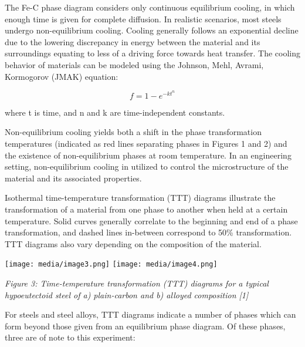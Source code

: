\documentclass[]{article}
\begin{document}
The Fe-C phase diagram considers only continuous equilibrium cooling, in
which enough time is given for complete diffusion. In realistic
scenarios, most steels undergo non-equilibrium cooling. Cooling
generally follows an exponential decline due to the lowering discrepancy
in energy between the material and its surroundings equating to less of
a driving force towards heat transfer. The cooling behavior of materials
can be modeled using the Johnson, Mehl, Avrami, Kormogorov (JMAK)
equation:

\[f = 1 - e^{- kt^{n}}\]

where t is time, and n and k are time-independent constants.

Non-equilibrium cooling yields both a shift in the phase transformation
temperatures (indicated as red lines separating phases in Figures 1 and
2) and the existence of non-equilibrium phases at room temperature. In
an engineering setting, non-equilibrium cooling in utilized to control
the microstructure of the material and its associated properties.

Isothermal time-temperature transformation (TTT) diagrams illustrate the
transformation of a material from one phase to another when held at a
certain temperature. Solid curves generally correlate to the beginning
and end of a phase transformation, and dashed lines in-between
correspond to 50\% transformation. TTT diagrams also vary depending on
the composition of the material.

\texttt{[image: media/image3.png]}
\texttt{[image: media/image4.png]}

\emph{Figure 3: Time-temperature transformation (TTT) diagrams for a
typical hypoeutectoid steel of a) plain-carbon and b) alloyed
composition {[}1{]}}

For steels and steel alloys, TTT diagrams indicate a number of phases
which can form beyond those given from an equilibrium phase diagram. Of
these phases, three are of note to this experiment:
\end{document}
